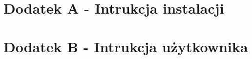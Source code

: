 \chapter*{Dodatek A - Intrukcja instalacji}
\label{sec:instrukcja-instalacji}



\newpage
\thispagestyle{empty}
\chapter*{Dodatek B - Intrukcja użytkownika}
\label{sec:instrukcja-uzytkownika}

